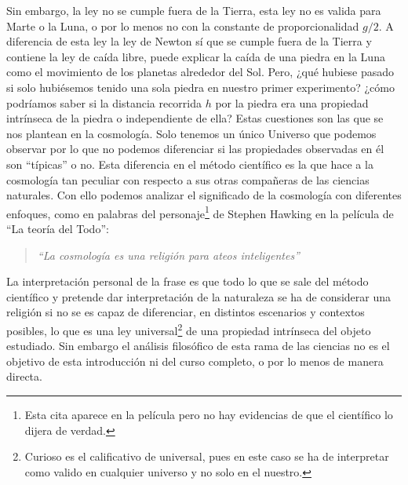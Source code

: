 Sin embargo, la ley no se cumple fuera de la Tierra, esta ley no es valida para Marte o la Luna, o por lo menos no con la constante de proporcionalidad $g/2$. A diferencia de esta ley la ley de Newton sí que se cumple fuera de la Tierra y contiene la ley de caída libre, puede explicar la caída de una piedra en la Luna como el movimiento de los planetas alrededor del Sol. Pero, ¿qué hubiese pasado si solo hubiésemos  tenido una sola piedra en nuestro primer experimento? ¿cómo podríamos saber si la distancia recorrida $h$ por la piedra era una propiedad intrínseca de la piedra o independiente de ella? Estas cuestiones son las que se nos plantean en la cosmología. Solo tenemos un único Universo que podemos observar por lo que no podemos diferenciar si las propiedades observadas en él son ``típicas'' o no. Esta diferencia en el método científico es la que hace a la cosmología tan peculiar con respecto a sus otras compañeras de las ciencias naturales. Con ello podemos analizar el significado de la cosmología con diferentes enfoques, como en palabras del personaje\footnote{Esta cita aparece en la película pero no hay evidencias de que el científico lo dijera de verdad.} de Stephen Hawking en la película de ``La teoría del Todo'':
\begin{quote}
\textit{``La cosmología es una religión para ateos inteligentes''}
\end{quote} 
La interpretación personal de la frase es que todo lo que se sale del método científico y pretende dar interpretación de la naturaleza se ha de considerar una religión si no se es capaz de diferenciar, en distintos escenarios y contextos posibles, lo que es una ley universal\footnote{Curioso es el calificativo de universal, pues en este caso se ha de interpretar como valido en cualquier universo y no solo en el nuestro.} de una propiedad intrínseca del objeto estudiado. Sin embargo el análisis filosófico de esta rama de las ciencias no es el objetivo de esta introducción ni del curso completo, o por lo menos de manera directa.\\

